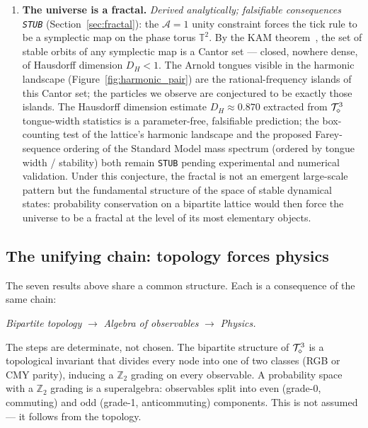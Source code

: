 \begin{enumerate}
\item \textbf{The universe is a fractal.}
\textit{Derived analytically; falsifiable consequences \texttt{STUB}}
(Section~\ref{sec:fractal}):
the $\mathcal{A}=1$ unity constraint forces the tick rule to be a
symplectic map on the phase torus $\mathbb{T}^2$.
By the KAM theorem~\cite{kolmogorov1954, arnold1963, moser1962},
the set of stable orbits of any symplectic map is a Cantor set ---
closed, nowhere dense, of Hausdorff dimension $D_H < 1$.
The Arnold tongues visible in the harmonic landscape
(Figure~\ref{fig:harmonic_pair}) are the rational-frequency islands of
this Cantor set; the particles we observe are conjectured to be
exactly those islands.
The Hausdorff dimension estimate $D_H \approx 0.870$ extracted from
$\mathcal{T}_\diamond^3$ tongue-width statistics is a parameter-free, falsifiable
prediction; the box-counting test of the lattice's harmonic landscape
and the proposed Farey-sequence ordering of the Standard Model mass
spectrum (ordered by tongue width / stability) both remain
\texttt{STUB} pending experimental and numerical validation.
Under this conjecture, the fractal is not an emergent large-scale
pattern but the fundamental structure of the space of stable
dynamical states: probability conservation on a bipartite lattice
would then force the universe to be a fractal at the level of its
most elementary objects.

\end{enumerate}

\subsection*{The unifying chain: topology forces physics}

The seven results above share a common structure.
Each is a consequence of the same chain:

\begin{center}
\textit{Bipartite topology} $\longrightarrow$
\textit{Algebra of observables} $\longrightarrow$
\textit{Physics.}
\end{center}

The steps are determinate, not chosen.
The bipartite structure of $\mathcal{T}_\diamond^3$ is a topological invariant that
divides every node into one of two classes (RGB or CMY parity),
inducing a $\mathbb{Z}_2$ grading on every observable.
A probability space with a $\mathbb{Z}_2$ grading is a superalgebra:
observables split into even (grade-0, commuting) and odd (grade-1,
anticommuting) components.
This is not assumed --- it follows from the topology.

